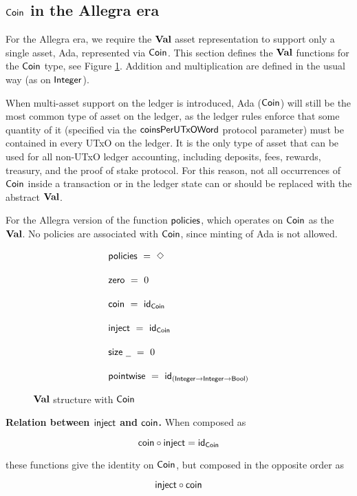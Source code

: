 \subsection{$\mathsf{Coin}$ in the Allegra era}

For the Allegra era, we require the $\mathbf{Val}$ asset representation to support
only a single asset, Ada, represented via $\mathsf{Coin}$. This section defines the
$\mathbf{Val}$ functions for the $\mathsf{Coin}$ type, see Figure
\ref{fig:coin}. Addition and multiplication are defined in the usual way
(as on $\mathsf{Integer}$).

When multi-asset support on the ledger is introduced, Ada ($\mathsf{Coin}$) will still be
the most common type of asset on the ledger, as the ledger rules enforce that
some quantity of it (specified via
the $\mathsf{coinsPerUTxOWord}$ protocol parameter) must
be contained in every UTxO on the ledger.
It is the only
type of asset that can be used for all non-UTxO ledger accounting, including deposits,
fees, rewards, treasury, and the proof of stake protocol. For this reason, not
all occurrences of $\mathsf{Coin}$ inside a transaction or in the ledger state can or
should be replaced with the abstract $\mathbf{Val}$.

For the Allegra version of the function $\mathsf{policies}$, which operates on $\mathsf{Coin}$ as the
$\mathbf{Val}$. No policies are associated with $\mathsf{Coin}$, since minting of Ada is not allowed.

\begin{figure}[htb]
  \begin{align*}
      & \fun{policies} ~=~ \Nothing
      \nextdef
      & \fun{zero} ~=~ 0
      \nextdef
      & \fun{coin} ~=~ \fun{id}_{\Coin}
      \nextdef
      & \fun{inject} ~=~ \fun{id}_{\Coin}
      \nextdef
      & \fun{size}~\wcard ~=~ 0
      \nextdef
      & \fun{pointwise} ~=~ \fun{id}_{(\Integer \to \Integer \to \Bool)}
  \end{align*}
  \caption{$\mathbf{Val}$ structure with $\mathsf{Coin}$}
  \label{fig:coin}
\end{figure}



\noindent \textbf{Relation between $\mathsf{inject}$ and $\mathsf{coin}$.}
When composed as

\[\mathsf{coin} \circ \mathsf{inject} = \mathsf{id}_{\mathsf{Coin}}\]

these functions give the identity on $\mathsf{Coin}$, but composed in the opposite order as

\[\mathsf{inject} \circ \mathsf{coin}\]

